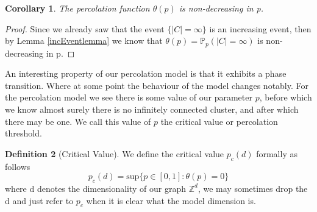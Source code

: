 \documentclass[a4paper,11pt]{article}
\newtheorem{theorem}{Theorem}[section]
\newtheorem{lemma}[theorem]{Lemma}
\newtheorem{corollary}[theorem]{Corollary}
\theoremstyle{definition}
\newtheorem{definition}[theorem]{Definition}
\newcommand{\ints}{\mathbb{Z}}
\newcommand{\prob}{\mathbb{P}_p}
\begin{document}
\begin{corollary}
	The percolation function $\theta(p)$ is non-decreasing in p.
\end{corollary}

\begin{proof}
	Since we already saw that the event $\{|C| = \infty\}$ is an increasing event, then by Lemma \ref{incEventlemma} we know that $\theta(p) = \prob(|C| = \infty)$ is non-decreasing in p.
\end{proof}

An interesting property of our percolation model is that it exhibits a phase transition. Where at some point the behaviour of the model changes notably.
For the percolation model we see there is some value of our parameter $p$, before which we know almost surely there is no infinitely connected cluster, and after which there may be one.
We call this value of $p$ the critical value or percolation threshold.
\begin{definition}[Critical Value]
	We define the critical value $p_c(d)$ formally as follows
	$$p_c(d) = \text{sup}\{p \in [0,1]: \theta(p)=0\} $$
	where d denotes the dimensionality of our graph $\ints^d$, we may sometimes drop the d and just refer to $p_c$ when it is clear what the model dimension is.
\end{definition}







\end{document}

